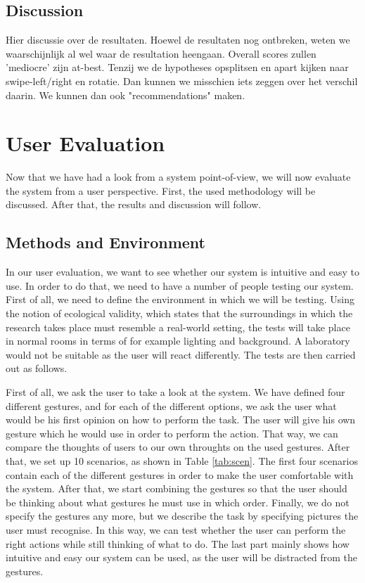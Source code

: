 \documentclass[11pt,a4paper]{article}
\begin{document}
\subsection{Discussion}
Hier discussie over de resultaten. Hoewel de resultaten nog ontbreken, weten we waarschijnlijk al wel waar de resultation heengaan. Overall scores zullen 'mediocre' zijn at-best. Tenzij we de hypotheses opsplitsen en apart kijken naar swipe-left/right en rotatie. Dan kunnen we misschien iets zeggen over het verschil daarin. We kunnen dan ook "recommendations" maken.


\section{User Evaluation}
Now that we have had a look from a system point-of-view, we will now evaluate the system from a user perspective. First, the used methodology will be discussed. After that, the results and discussion will follow.

\subsection{Methods and Environment}
\label{sub:userMeth}
In our user evaluation, we want to see whether our system is intuitive and easy to use. In order to do that, we need to have a number of people testing our system. First of all, we need to define the environment in which we will be testing. Using the notion of ecological validity, which states that the surroundings in which the research takes place must resemble a real-world setting\cite{brewer2000research}, the tests will take place in normal rooms in terms of for example lighting and background. A laboratory would not be suitable as the user will react differently. The tests are then carried out as follows. 

First of all, we ask the user to take a look at the system. We have defined four different gestures, and for each of the different options, we ask the user what would be his first opinion on how to perform the task. The user will give his own gesture which he would use in order to perform the action. That way, we can compare the thoughts of users to our own throughts on the used gestures. After that, we set up 10 scenarios, as shown in Table \ref{tab:scen}. The first four scenarios contain each of the different gestures in order to make the user comfortable with the system. After that, we start combining the gestures so that the user should be thinking about what gestures he must use in which order. Finally, we do not specify the gestures any more, but we describe the task by specifying pictures the user must recognise. In this way, we can test whether the user can perform the right actions while still thinking of what to do. The last part mainly shows how intuitive and easy our system can be used, as the user will be distracted from the gestures. 
\end{document}
